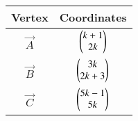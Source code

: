 \begin{tabular}[12pt]{ |c|c|}
\hline
\textbf{Vertex} & \textbf{Coordinates}\\ 
\hline
$\vec{A}$ & $\begin{pmatrix}k+1 \\ 2k\end{pmatrix}$  \\
\hline 
$\vec{B}$ & $\begin{pmatrix}3k \\ 2k+3\end{pmatrix}$  \\
\hline
$\vec{C}$ & $\begin{pmatrix}5k-1 \\ 5k\end{pmatrix}$  \\
\hline 
\end{tabular}

